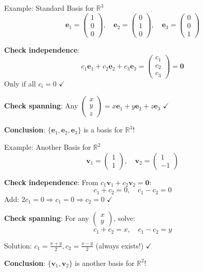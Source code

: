 \documentclass[10pt]{beamer}
\theoremstyle{definition}
\newcommand{\x}[1]{\alert{\textbf{#1}}}
\begin{document}
\begin{frame}{Example: Standard Basis for $\mathbb{R}^3$}
$$\mathbf{e}_1 = \begin{pmatrix} 1 \\ 0 \\ 0 \end{pmatrix}, \quad \mathbf{e}_2 = \begin{pmatrix} 0 \\ 1 \\ 0 \end{pmatrix}, \quad \mathbf{e}_3 = \begin{pmatrix} 0 \\ 0 \\ 1 \end{pmatrix}$$

\vfill
\textbf{Check independence}:
$$c_1\mathbf{e}_1 + c_2\mathbf{e}_2 + c_3\mathbf{e}_3 = \begin{pmatrix} c_1 \\ c_2 \\ c_3 \end{pmatrix} = \mathbf{0}$$
Only if all $c_i = 0$ $\checkmark$

\vfill
\textbf{Check spanning}:
Any $\begin{pmatrix} x \\ y \\ z \end{pmatrix} = x\mathbf{e}_1 + y\mathbf{e}_2 + z\mathbf{e}_3$ $\checkmark$

\vfill
\x{Conclusion}: $\{\mathbf{e}_1, \mathbf{e}_2, \mathbf{e}_3\}$ is a basis for $\mathbb{R}^3$!
\end{frame}

\begin{frame}{Example: Another Basis for $\mathbb{R}^2$}
$$\mathbf{v}_1 = \begin{pmatrix} 1 \\ 1 \end{pmatrix}, \quad \mathbf{v}_2 = \begin{pmatrix} 1 \\ -1 \end{pmatrix}$$

\vfill
\textbf{Check independence}: From $c_1\mathbf{v}_1 + c_2\mathbf{v}_2 = \mathbf{0}$:
$$c_1 + c_2 = 0, \quad c_1 - c_2 = 0$$
Add: $2c_1 = 0 \Rightarrow c_1 = 0 \Rightarrow c_2 = 0$ $\checkmark$

\vfill
\textbf{Check spanning}: For any $\begin{pmatrix} x \\ y \end{pmatrix}$, solve:
$$c_1 + c_2 = x, \quad c_1 - c_2 = y$$

Solution: $c_1 = \frac{x+y}{2}, c_2 = \frac{x-y}{2}$ (always exists!) $\checkmark$

\vfill
\x{Conclusion}: $\{\mathbf{v}_1, \mathbf{v}_2\}$ is another basis for $\mathbb{R}^2$!
\end{frame}
\end{document}

